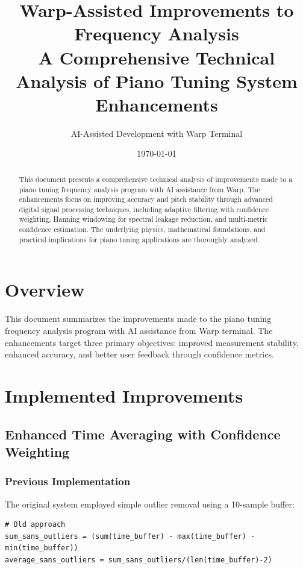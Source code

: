 \documentclass[11pt,a4paper]{article}
\title{\textbf{Warp-Assisted Improvements to Frequency Analysis} \\ 
       \large{A Comprehensive Technical Analysis of Piano Tuning System Enhancements}}
\author{AI-Assisted Development with Warp Terminal}
\date{\today}
\begin{document}
\maketitle

\begin{abstract}
This document presents a comprehensive technical analysis of improvements made to a piano tuning frequency analysis program with AI assistance from Warp. The enhancements focus on improving accuracy and pitch stability through advanced digital signal processing techniques, including adaptive filtering with confidence weighting, Hanning windowing for spectral leakage reduction, and multi-metric confidence estimation. The underlying physics, mathematical foundations, and practical implications for piano tuning applications are thoroughly analyzed.
\end{abstract}

\tableofcontents
\newpage

\section{Overview}

This document summarizes the improvements made to the piano tuning frequency analysis program with AI assistance from Warp terminal. The enhancements target three primary objectives: improved measurement stability, enhanced accuracy, and better user feedback through confidence metrics.

\section{Implemented Improvements}

\subsection{Enhanced Time Averaging with Confidence Weighting}

\subsubsection{Previous Implementation}
The original system employed simple outlier removal using a 10-sample buffer:
\begin{lstlisting}[caption=Original Time Averaging Approach]
# Old approach
sum_sans_outliers = (sum(time_buffer) - max(time_buffer) - min(time_buffer))
average_sans_outliers = sum_sans_outliers/(len(time_buffer)-2)
\end{lstlisting}
\end{document}
